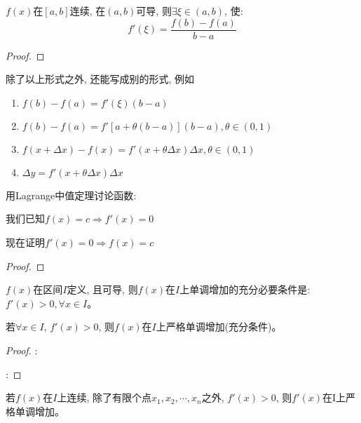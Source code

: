 \begin{theorem}[Lagrange中值定理]
    $f(x)$在$[a, b]$连续, 在$(a, b)$可导, 则$\exists \xi \in (a, b)$, 使:
    \begin{equation*}
        f'(\xi) = \frac{f(b)-f(a)}{b-a}
    \end{equation*}
\end{theorem}
\begin{proof}
    
\end{proof}
\begin{remark}
    除了以上形式之外, 还能写成别的形式, 例如
    \begin{enumerate}
        \item $f(b)-f(a)=f'(\xi)(b-a)$
        \item $f(b)-f(a)=f'[a+\theta(b-a)](b-a), \theta \in (0, 1)$
        \item $f(x+\Delta x) - f(x) = f'(x+\theta \Delta x)\Delta x, \theta \in (0, 1)$
        \item $\Delta y = f'(x+\theta \Delta x)\Delta x$
    \end{enumerate}
\end{remark}

\begin{example}
    用Lagrange中值定理讨论函数:

    我们已知$f(x) = c \Rightarrow f'(x) = 0$

    现在证明$f'(x) = 0 \Rightarrow f(x) = c$
\end{example}
\begin{proof}
    
\end{proof}

\begin{theorem}[一阶导数与函数的单调性关系]
    $f(x)$在区间$I$定义, 且可导, 则$f(x)$在$I$上单调增加的充分必要条件是: $f'(x) > 0, \forall x \in I$。

    若$\forall x \in I$, $f'(x)>0$, 则$f(x)$在$I$上严格单调增加(充分条件)。
\end{theorem}
\begin{proof}
    :

    :

\end{proof}
\begin{remark}
    若$f(x)$在$I$上连续, 除了有限个点$x_1, x_2, \cdots, x_n$之外, $f'(x)>0$, 则$f'(x)$在I上严格单调增加。
\end{remark}

